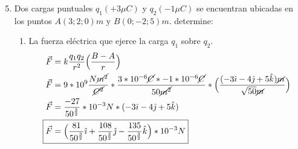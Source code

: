 \documentclass[12pt, twoside]{article}
\begin{document}
\begin{enumerate}
	\setcounter{enumi}{4}
	\item Dos cargas puntuales $q_1(+3\mu C)$ y $q_2(-1\mu C)$
		se encuentran ubicadas en los puntos $A(3;2;0)m$ y $B(0;-2;5)m$.
		determine:
		\begin{enumerate}
			\item La fuerza eléctrica que ejerce la carga $q_1$ sobre $q_2$.
				\begin{align*}
					\vec{F} &= k \frac{q_1q_2}{r^2} \Big{(} \frac{B-A}{r} \Big{)}\\
					\vec{F} &= 9*10^9 \frac{N\cancel{m^2}}{\cancel{C^2}}*
					\frac{3*10^{-6}\cancel{C}*-1*10^{-6}\cancel{C}}{50\cancel{m^2}}*
					\Big{(} \frac{(-3\hat{\imath}-4\hat{\jmath}+5\hat{k})\cancel{m}}{\sqrt{50}\cancel{m}} \Big{)}\\
					\vec{F} &= \frac{-27}{50^ \frac{3}{2} } *10^{-3} N*
					(-3\hat{\imath}-4\hat{\jmath}+5\hat{k})\\
					\Aboxed{
						\vec{F} &= \Big{(}
						\frac{81}{50^{ \frac{3}{2} }}\hat{\imath}+
						\frac{108}{50^{ \frac{3}{2} }}\hat{\jmath}-
						\frac{135}{50^{ \frac{3}{2} }}\hat{k}
						\Big{)}*10^{-3}N
					}
				\end{align*}


\end{enumerate}
\end{enumerate}
\end{document}
